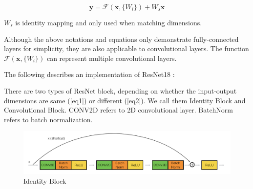 \begin{equation} \label{eq2}
\mathbf{y} = \mathcal{F} (\mathbf{x}, \{W_i\}) + W_s \mathbf{x}
\end{equation}

$W_s$ is identity mapping and only used when matching dimensions. 

Although the above notations and equations only demonstrate fully-connected layers for simplicity, they are also applicable to convolutional layers. The function $\mathcal{F} (\mathbf{x}, \{W_i\})$ can represent multiple convolutional layers.

The following describes an implementation of ResNet18 \citep{resnet_implement}:

There are two types of ResNet block, depending on whether the input-output dimensions are same (\ref{eq1}) or different (\ref{eq2}). We call them Identity Block and Convolutional Block. CONV2D refers to 2D convolutional layer. BatchNorm refers to batch normalization.

\begin{figure}[h]
	\centering
	\includegraphics[width=\textwidth]{Figs/identityblock.png}
    \caption{Identity Block \citep{resnet_implement}}
    \label{identityblock}
\end{figure}

